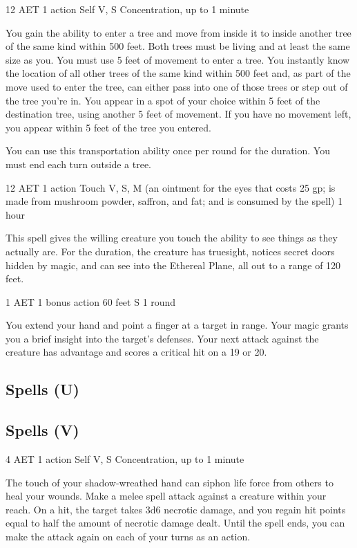 {12 AET}
{1 action}
{Self}
{V, S}
{Concentration, up to 1 minute}

You gain the ability to enter a tree and move from inside it to inside another tree of the same kind within 500 feet. Both trees must be living and at least the same size as you. You must use 5 feet of movement to enter a tree. You instantly know the location of all other trees of the same kind within 500 feet and, as part of the move used to enter the tree, can either pass into one of those trees or step out of the tree you're in. You appear in a spot of your choice within 5 feet of the destination tree, using another 5 feet of movement. If you have no movement left, you appear within 5 feet of the tree you entered.

You can use this transportation ability once per round for the duration. You must end each turn outside a tree.

{12 AET}
{1 action}
{Touch}
{V, S, M (an ointment for the eyes that costs 25 gp; is made from mushroom powder, saffron, and fat; and is consumed by the spell)}
{1 hour}

This spell gives the willing creature you touch the ability to see things as they actually are. For the duration, the creature has truesight, notices secret doors hidden by magic, and can see into the Ethereal Plane, all out to a range of 120 feet.

{1 AET}
{1 bonus action}
{60 feet}
{S}
{1 round}

You extend your hand and point a finger at a target in range. Your magic grants you a brief insight into the target's defenses. Your next attack against the creature has advantage and scores a critical hit on a 19 or 20. 

\subsection{Spells (U)}

\subsection{Spells (V)}

{4 AET}
{1 action}
{Self}
{V, S}
{Concentration, up to 1 minute}

The touch of your shadow-wreathed hand can siphon life force from others to heal your wounds. Make a melee spell attack against a creature within your reach. On a hit, the target takes 3d6 necrotic damage, and you regain hit points equal to half the amount of necrotic damage dealt. Until the spell ends, you can make the attack again on each of your turns as an action.

